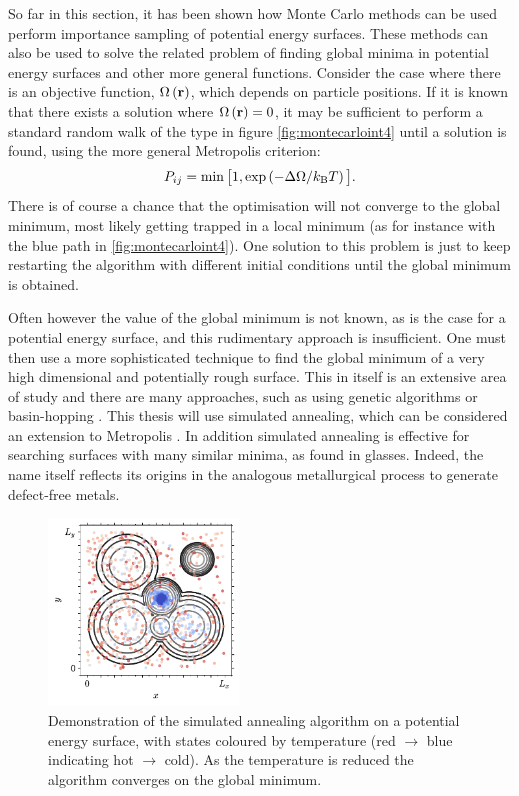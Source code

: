 So far in this section, it has been shown how Monte Carlo methods can be used perform importance sampling of potential energy surfaces.
These methods can also be used to solve the related problem of finding global minima in potential energy surfaces and other more general functions.
Consider the case where there is an objective function, $\Omega\left(\mathbf{r}\right)$, which depends on particle positions.
If it is known that there exists a solution where $\Omega\left(\mathbf{r}\right)=0$, it may be sufficient to perform a standard random walk of the type in figure \ref{fig:montecarloint4} until a solution is found, using the more general Metropolis criterion:
\begin{equation}
	\label{eq:objmetropolis}
	P_{ij} = \min\big[1,\exp\left(-\Delta\Omega/k_\text{B} T\right)\big].
\end{equation}
There is of course a chance that the optimisation will not converge to the global minimum, most likely getting trapped in a local minimum (as for instance with the blue path in \ref{fig:montecarloint4}).
One solution to this problem is just to keep restarting the algorithm with different initial conditions until the global minimum is obtained.

Often however the value of the global minimum is not known, as is the case for a potential energy surface, and this rudimentary approach is insufficient.
One must then use a more sophisticated technique to find the global minimum of a very high dimensional and potentially rough surface.
This in itself is an extensive area of study and there are many approaches, such as using genetic algorithms or basin\--hopping \cite{Hartke1993,Niesse1996,Wales1997}.
This thesis will use simulated annealing, which can be considered an extension to Metropolis \mc{} \cite{Kirkpatrick1983}.
In addition simulated annealing is effective for searching surfaces with many similar minima, as found in glasses.
Indeed, the name itself reflects its origins in the analogous metallurgical process to generate defect\--free metals.

\begin{figure}[tb]
     \centering
    \includegraphics[width=0.45\textwidth]{./figures/methods/mc_2d_sa.pdf}
      \caption{Demonstration of the simulated annealing algorithm on a \td{} potential energy surface, with states coloured by temperature (red $\rightarrow$ blue indicating hot $\rightarrow$ cold). As the temperature is reduced the algorithm converges on the global minimum.}
      \label{fig:montecarloint5}
\end{figure}

